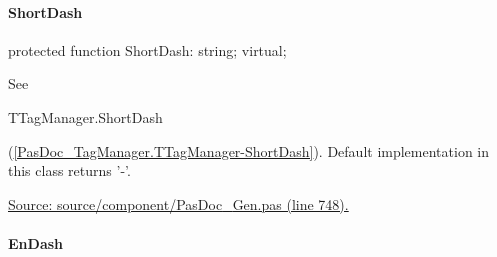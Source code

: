 \documentclass{report}
\newif\ifpdf
\begin{document}
\paragraph*{ShortDash}\hspace*{\fill}

\label{PasDoc_Gen.TDocGenerator-ShortDash}
\begin{list}{}{
\setlength{\itemindent}{0cm}
\setlength{\listparindent}{0cm}
\setlength{\leftmargin}{\evensidemargin}
\addtolength{\leftmargin}{\tmplength}
\settowidth{\labelsep}{X}
\addtolength{\leftmargin}{\labelsep}
\setlength{\labelwidth}{\tmplength}
}
\item[\textbf{Declaration}\hfill]
\ifpdf
\begin{flushleft}
\fi
\begin{ttfamily}
protected function ShortDash: string; virtual;\end{ttfamily}

\ifpdf
\end{flushleft}
\fi

\par
\item[\textbf{Description}]
See \begin{ttfamily}TTagManager.ShortDash\end{ttfamily}(\ref{PasDoc_TagManager.TTagManager-ShortDash}). Default implementation in this class returns '{-}'.\par
\href{https://github.com/pasdoc/pasdoc/blob/master/source/component/PasDoc_Gen.pas#L748}{Source: source/component/PasDoc{\_}Gen.pas (line 748).}

\end{list}
\paragraph*{EnDash}\hspace*{\fill}
\end{document}
